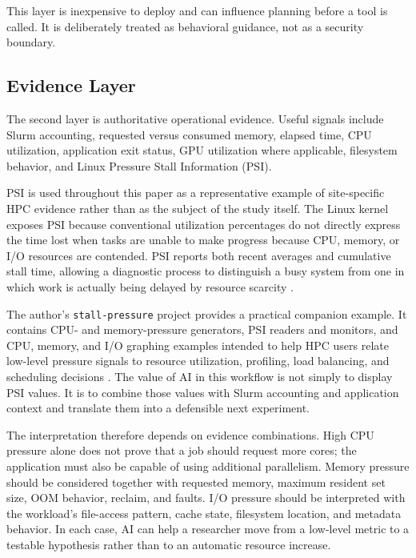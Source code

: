 \documentclass[11pt]{article}
\begin{document}
This layer is inexpensive to deploy and can influence planning before a tool is called. It is deliberately treated as behavioral guidance, not as a security boundary.

\subsection{Evidence Layer}

The second layer is authoritative operational evidence. Useful signals include Slurm accounting, requested versus consumed memory, elapsed time, CPU utilization, application exit status, GPU utilization where applicable, filesystem behavior, and Linux Pressure Stall Information (PSI).

PSI is used throughout this paper as a representative example of site-specific HPC evidence rather than as the subject of the study itself. The Linux kernel exposes PSI because conventional utilization percentages do not directly express the time lost when tasks are unable to make progress because CPU, memory, or I/O resources are contended. PSI reports both recent averages and cumulative stall time, allowing a diagnostic process to distinguish a busy system from one in which work is actually being delayed by resource scarcity \cite{linuxpsi}.

The author's \texttt{stall-pressure} project provides a practical companion example. It contains CPU- and memory-pressure generators, PSI readers and monitors, and CPU, memory, and I/O graphing examples intended to help HPC users relate low-level pressure signals to resource utilization, profiling, load balancing, and scheduling decisions \cite{stallpressure}. The value of AI in this workflow is not simply to display PSI values. It is to combine those values with Slurm accounting and application context and translate them into a defensible next experiment.

The interpretation therefore depends on evidence combinations. High CPU pressure alone does not prove that a job should request more cores; the application must also be capable of using additional parallelism. Memory pressure should be considered together with requested memory, maximum resident set size, OOM behavior, reclaim, and faults. I/O pressure should be interpreted with the workload's file-access pattern, cache state, filesystem location, and metadata behavior. In each case, AI can help a researcher move from a low-level metric to a testable hypothesis rather than to an automatic resource increase.
\end{document}
